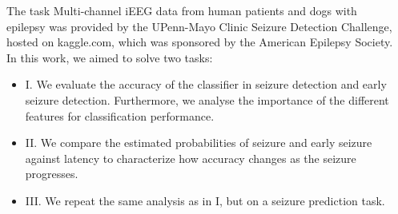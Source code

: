 \documentclass[final,t,overlay, xcolor=table, sans, mathserif]{beamer}
\begin{document}
\begin{frame}{}
\begin{columns}[t]
\begin{column}{.35\linewidth}
\end{column}
\begin{column}{.65\linewidth}

 
\begin{block}{The task}
Multi-channel iEEG data from human patients and dogs with epilepsy was provided by the UPenn-Mayo Clinic
Seizure Detection Challenge, hosted on kaggle.com, which was sponsored by the American Epilepsy Society. \\
In this work, we aimed to solve two tasks:
\begin{itemize}
\item I. We evaluate the accuracy of the classifier in seizure detection and early seizure detection. Furthermore, we
analyse the importance of the different features for classification performance.
\item II. We compare the estimated probabilities of seizure and early seizure against latency to characterize how accuracy
changes as the seizure progresses.
\item III. We repeat the same analysis as in I, but on a seizure prediction task.
\end{itemize}
\end{block}


\end{column}
\end{columns}
\end{frame}
\end{document}
